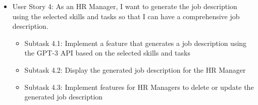 \begin{enumerate}
\begin{itemize}
              \item User Story 4: As an HR Manager, I want to generate the job description using the selected skills and tasks so that I can have a comprehensive job description. \\
                    \begin{itemize}
                        \item Subtask 4.1: Implement a feature that generates a job description using the GPT-3 API based on the selected skills and tasks
                        \item Subtask 4.2: Display the generated job description for the HR Manager
                        \item Subtask 4.3: Implement features for HR Managers to delete or update the generated job description
                    \end{itemize}
          \end{itemize}
          

\end{enumerate}
